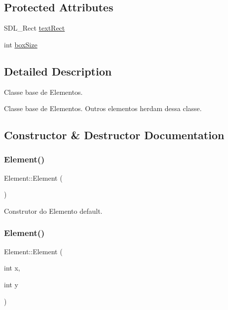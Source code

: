 \subsection*{Protected Attributes}
\begin{DoxyCompactItemize}
\item 
S\+D\+L\+\_\+\+Rect \hyperlink{classElement_a79d353f4c8bb44fe60390d02571cac64}{text\+Rect}
\item 
int \hyperlink{classElement_a692cd0e79fb7323679a381556a58aaf8}{box\+Size}
\end{DoxyCompactItemize}


\subsection{Detailed Description}
Classe base de Elementos. 

Classe base de Elementos. Outros elementos herdam dessa classe. 

\subsection{Constructor \& Destructor Documentation}
\mbox{\label{classElement_a084081001b0f14ae12d612c866df861c}} 
\subsubsection{\texorpdfstring{Element()}{Element()}\hspace{0.1cm}{\footnotesize\ttfamily [1/2]}}
{\footnotesize\ttfamily Element\+::\+Element (\begin{DoxyParamCaption}{ }\end{DoxyParamCaption})\hspace{0.3cm}{\ttfamily [default]}}



Construtor do Elemento default. 

\mbox{\label{classElement_ae385b104c66f092731777d70775b7f55}} 
\subsubsection{\texorpdfstring{Element()}{Element()}\hspace{0.1cm}{\footnotesize\ttfamily [2/2]}}
{\footnotesize\ttfamily Element\+::\+Element (\begin{DoxyParamCaption}\item[{int}]{x,  }\item[{int}]{y }\end{DoxyParamCaption})}



